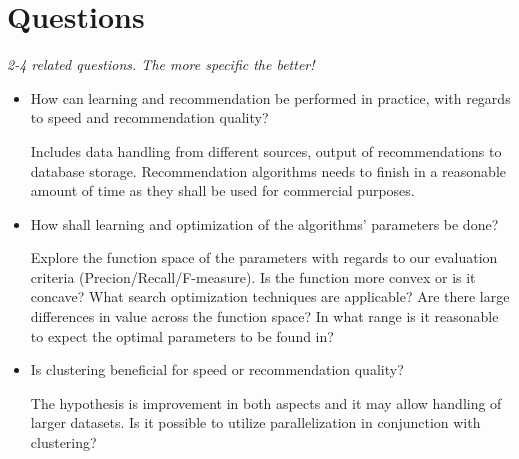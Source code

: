 
\section{Questions}\label{sec:intro:questions}

\textit{2-4 related questions. The more specific the better!}

\begin{itemize}
    \item How can learning and recommendation be performed in practice, with regards to speed and recommendation quality?

          Includes data handling from different sources, output of recommendations to database storage. Recommendation algorithms needs to finish in a reasonable amount of time as they shall be used for commercial purposes.

    \item How shall learning and optimization of the algorithms' parameters be done?

          Explore the function space of the parameters with regards to our evaluation criteria (Precion/Recall/F-measure). Is the function more convex or is it concave? What search optimization techniques are applicable? Are there large differences in value across the function space? In what range is it reasonable to expect the optimal parameters to be found in?

    \item Is clustering beneficial for speed or recommendation quality?

          The hypothesis is improvement in both aspects and it may allow handling of larger datasets.
          Is it possible to utilize parallelization in conjunction with clustering?
\end{itemize}

